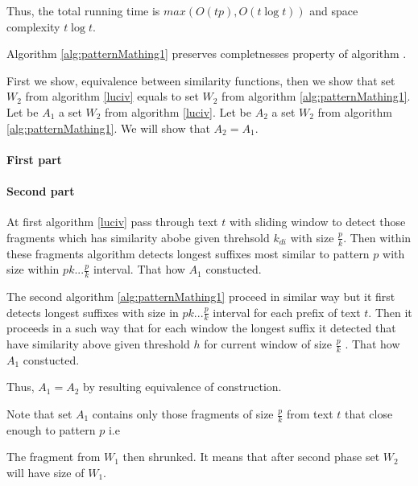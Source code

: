 Thus, the total running time is $max(O(tp),O(t \log t))$ and space complexity $t \log t$. 


\begin{theorem}
Algorithm \ref{alg:patternMathing1} preserves completnesses property of algorithm \cite{luciv2019interactive}.

\end{theorem}

First we show, equivalence between similarity functions, then we
show that set $W_{2}$ from algorithm \ref{luciv} equals to set $W_{2}$ from algorithm \ref{alg:patternMathing1}.  
Let be $A_1$ a set $W_{2}$ from algorithm \ref{luciv}.
Let be $A_2$ a set $W_{2}$ from algorithm \ref{alg:patternMathing1}.
We will show that $A_2 = A_1$.

\paragraph{First part}


\paragraph{Second part}

At first algorithm \ref{luciv} pass through text $t$ with sliding window to detect those fragments which has similarity abobe given threhsold $k_{di}$ with size $\frac{p}{k}$.
Then within these fragments algorithm detects longest suffixes most similar to pattern $p$ with size within  $pk...\frac{p}{k}$ interval.
That how $A_1$ constucted.

The second algorithm \ref{alg:patternMathing1} proceed in similar way but it first detects longest suffixes with size in $pk...\frac{p}{k}$ interval for each prefix of text $t$.
Then it proceeds in a such way that for each window the longest suffix it detected that have similarity above given threshold $h$ for current window of size $\frac{p}{k}$ .
That how $A_1$ constucted.

Thus, $A_1=A_2$  by resulting equivalence of construction. 



  

Note that set $A_{1}$ contains only those fragments of size $\frac{p}{k}$ from text $t$ that close enough to pattern $p$ i.e 

The fragment from $W_{1}$ then shrunked.
It means that after second phase set $W_{2}$ will have size  of $W_{1}$. 
